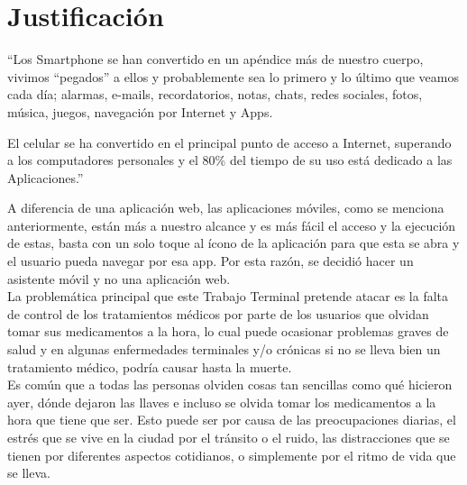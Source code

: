 \section{Justificación}

“Los Smartphone se han convertido en un apéndice más de nuestro cuerpo, vivimos “pegados” a ellos y probablemente sea lo primero y lo último que veamos cada día; alarmas, e-mails, recordatorios, notas, chats, redes sociales, fotos, música, juegos, navegación por Internet y Apps.

El celular se ha convertido en el principal punto de acceso a Internet, superando a los computadores personales y el 80\% del tiempo
de su uso está dedicado a las Aplicaciones.”\cite{Referencia22}

A diferencia de una aplicación web, las aplicaciones móviles, como se menciona anteriormente, están más a nuestro alcance y es más fácil el acceso y la ejecución de estas, basta con un solo toque al ícono de la aplicación para que esta se abra y el usuario pueda navegar por esa app. Por esta razón, se decidió hacer un asistente móvil y no una aplicación web.\\
La problemática principal que este Trabajo Terminal pretende atacar es la falta de control de los tratamientos médicos por parte de los usuarios que olvidan tomar sus medicamentos a la hora, lo cual puede ocasionar problemas graves de salud y en algunas enfermedades terminales y/o crónicas si no se lleva bien un tratamiento médico, podría causar hasta la muerte.\\
Es común que a todas las personas olviden cosas tan sencillas como qué hicieron ayer, dónde dejaron las llaves e incluso se olvida
tomar los medicamentos a la hora que tiene que ser. Esto puede ser por causa de las preocupaciones diarias, el estrés que se vive en la ciudad por el tránsito o el ruido, las distracciones que se tienen por diferentes aspectos cotidianos, o simplemente por el ritmo de vida que se lleva.

